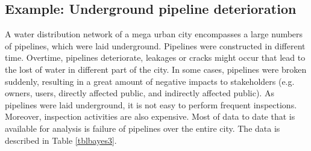 \subsection{Example: Underground pipeline deterioration}
A water distribution network of a mega urban city encompasses a large numbers of pipelines, which were laid underground. Pipelines were constructed in different time. Overtime, pipelines deteriorate, leakages or cracks might occur that lead to the lost of water in different part of the city. In some cases, pipelines were broken suddenly, resulting in a great amount of negative impacts to stakeholders (e.g. owners, users, directly affected public, and indirectly affected public). As pipelines were laid underground, it is not easy to perform frequent inspections. Moreover, inspection activities are also expensive. Most of data to date that is available for analysis is failure of pipelines over the entire city. The data is described in Table \ref{tblbayes3}.

